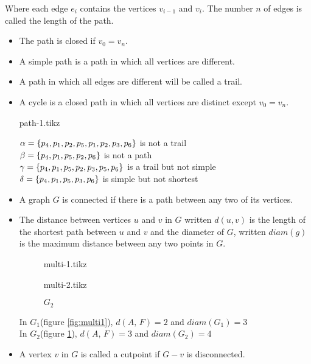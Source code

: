 \documentclass[../main-sheet.tex]{subfiles}
\begin{document}
Where each edge $ e_i $ contains the vertices $ v_{i-1} $ and $ v_i $. The number $ n $ of edges is called the length of the path.
\begin{itemize}
    \item The path is closed if $ v_0=v_n $.
    \item A simple path is a path in which all vertices are different.
    \item A path in which all edges are different will be called a trail.
    \item A cycle is a closed path in which all vertices are distinct except $ v_0=v_n $.\\
    \begin{center}
        {path-1.tikz}
    \end{center}
    $ \alpha=\left\{p_4,p_1,p_2,p_5,p_1,p_2,p_3,p_6\right\} $ is not a trail\\
    $ \beta=\left\{p_4,p_1,p_5,p_2,p_6\right\} $ is not a path\\
    $ \gamma=\left\{p_4,p_1,p_5,p_2,p_3,p_5,p_6\right\} $ is a trail but not simple\\
    $ \delta=\left\{p_4,p_1,p_5,p_3,p_6\right\} $ is simple but not shortest\\
    \item A graph $ G $ is connected if there is a path between any two of its vertices.
    \item The distance between vertices $ u $ and $ v $ in $ G $ written $ d(u,v) $ is the length of the shortest path between $ u $ and $ v $ and the diameter of $ G $, written $ diam(g) $ is the maximum distance between any two points in $ G $.
    \begin{figure}[H]
        \begin{minipage}[b]{.5\textwidth}
            \centering
            {multi-1.tikz}
            \caption{$ G_1 $}
            \label{fig:multi1}
        \end{minipage}
        \begin{minipage}[b]{.5\textwidth}
            \centering
            {multi-2.tikz}
            \caption{$ G_2 $}
            \label{fig:multi2}
        \end{minipage}
    \end{figure}
    In $ G_1 $(figure \ref{fig:multi1}), $ d(A,\,F)=2 $ and $ diam(G_1)=3 $\\
    In $ G_2 $(figure \ref{fig:multi2}), $ d(A,\,F)=3 $ and $ diam(G_2)=4 $
    \item A vertex $ v $ in $ G $ is called a cutpoint if $ G-v $ is disconnected.

\end{itemize}
\end{document}
